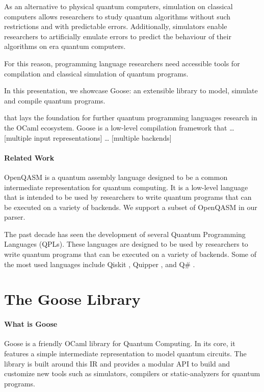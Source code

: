 \documentclass[a4paper]{easychair}
\begin{document}
As an alternative to physical quantum computers, simulation on classical computers allows researchers to study quantum algorithms without such restrictions and with predictable errors. Additionally, simulators enable researchers to artificially emulate errors to predict the behaviour of their algorithms on \nisq era quantum computers.

For this reason, programming language researchers need accessible tools for compilation and classical simulation of quantum programs.

In this presentation, we showcase Goose: an extensible library to model, simulate and compile quantum programs.

that lays the foundation for further quantum programming languages research in the OCaml ecosystem. Goose is a low-level compilation framework that … [multiple input representations] … [multiple backends]

\paragraph*{Related Work}

OpenQASM \cite{Cross2022} is a quantum assembly language designed to be a common intermediate representation for quantum computing. It is a low-level language that is intended to be used by researchers to write quantum programs that can be executed on a variety of backends. We support a subset of OpenQASM in our parser.

The past decade has seen the development of several Quantum Programming Languages (QPLs). These languages are designed to be used by researchers to write quantum programs that can be executed on a variety of backends. Some of the most used languages include Qiskit \cite{Qiskit}, Quipper \cite{Green2013}, and Q\# \cite{Svore2018}.

\section{The Goose Library}

\paragraph*{What is Goose} Goose is a friendly OCaml library for Quantum Computing. In its core, it features a simple intermediate representation to model quantum circuits. The library is built around this IR and provides a modular API to build and customize new tools such as simulators, compilers or static-analyzers for quantum programs.
\end{document}
